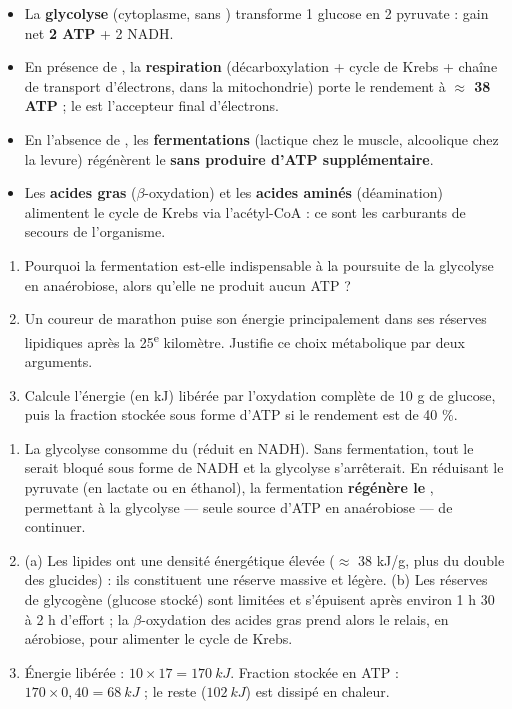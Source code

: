 \documentclass[11pt]{article}
\begin{document}
\begin{aretenir}
\begin{itemize}
\item La \textbf{glycolyse} (cytoplasme, sans ) transforme 1 glucose en 2 pyruvate : gain net \textbf{2 ATP} + 2 NADH.
\item En présence de , la \textbf{respiration} (décarboxylation + cycle de Krebs + chaîne de transport d'électrons, dans la mitochondrie) porte le rendement à \textbf{$\approx$ 38 ATP} ; le  est l'accepteur final d'électrons.
\item En l'absence de , les \textbf{fermentations} (lactique chez le muscle, alcoolique chez la levure) régénèrent le  \textbf{sans produire d'ATP supplémentaire}.
\item Les \textbf{acides gras} ($\beta$-oxydation) et les \textbf{acides aminés} (déamination) alimentent le cycle de Krebs via l'acétyl-CoA : ce sont les carburants de secours de l'organisme.
\end{itemize}
\end{aretenir}

\begin{exercice}
\begin{enumerate}
\item Pourquoi la fermentation est-elle indispensable à la poursuite de la glycolyse en anaérobiose, alors qu'elle ne produit aucun ATP ?
\item Un coureur de marathon puise son énergie principalement dans ses réserves lipidiques après la 25\textsuperscript{e} kilomètre. Justifie ce choix métabolique par deux arguments.
\item Calcule l'énergie (en kJ) libérée par l'oxydation complète de 10 g de glucose, puis la fraction stockée sous forme d'ATP si le rendement est de 40 \%.
\end{enumerate}
\end{exercice}

\begin{corrige}[Exercice n]
\begin{enumerate}
\item La glycolyse consomme du  (réduit en NADH). Sans fermentation, tout le  serait bloqué sous forme de NADH et la glycolyse s'arrêterait. En réduisant le pyruvate (en lactate ou en éthanol), la fermentation \textbf{régénère le }, permettant à la glycolyse — seule source d'ATP en anaérobiose — de continuer.
\item (a) Les lipides ont une densité énergétique élevée ($\approx$ 38 kJ/g, plus du double des glucides) : ils constituent une réserve massive et légère. (b) Les réserves de glycogène (glucose stocké) sont limitées et s'épuisent après environ 1 h 30 à 2 h d'effort ; la $\beta$-oxydation des acides gras prend alors le relais, en aérobiose, pour alimenter le cycle de Krebs.
\item Énergie libérée : $10 \times 17 = \SI{170}{kJ}$. Fraction stockée en ATP : $170 \times 0{,}40 = \SI{68}{kJ}$ ; le reste ($\SI{102}{kJ}$) est dissipé en chaleur.
\end{enumerate}
\end{corrige}
\end{document}
